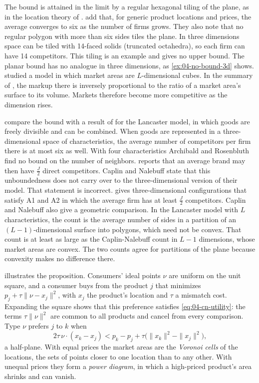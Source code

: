 The bound is attained in the limit by a regular hexagonal tiling of the plane, as in the location theory of
\citet{Losch1954}. \citet{CaplinNalebuff1991} add that, for generic product locations and prices, the average
converges to six as the number of firms grows. They also note that no regular polygon with more than six sides
tiles the plane. In three dimensions space can be tiled with 14-faced solids (truncated octahedra), so each firm
can have 14 competitors. This tiling is an example and gives no upper bound. The planar bound has no analogue in
three dimensions, as \cref{ex:04-no-bound-3d} shows. \citet{Stiglitz1986} studied a model in which market areas are
$L$-dimensional cubes. In the summary of \citet{CaplinNalebuff1991}, the markup there is inversely proportional to
the ratio of a market area's surface to its volume. Markets therefore become more competitive as the dimension
rises.

\citet[n.~17]{CaplinNalebuff1991} compare the bound with a result of \citet{ArchibaldRosenbluth1975} for the
Lancaster model, in which goods are freely divisible and can be combined. When goods are represented in a
three-dimensional space of characteristics, the average number of competitors per firm there is at most six as well.
With four characteristics Archibald and Rosenbluth find no bound on the number of neighbors.
\citet[Section 7.1.2, n.~6]{Tirole1988} reports that an average brand may then have $\frac{J}{2}$ direct
competitors. Caplin and Nalebuff state that this unboundedness does not carry over to the three-dimensional version
of their model. That statement is incorrect.  gives three-dimensional configurations that
satisfy A1 and A2 in which the average firm has at least $\frac{J}{2}$ competitors. Caplin and Nalebuff also give
a geometric comparison. In the Lancaster model with $L$ characteristics, the count is the average number of sides
in a partition of an $(L-1)$-dimensional surface into polygons, which need not be convex. That count is at least
as large as the Caplin-Nalebuff count in $L - 1$ dimensions, whose market areas are convex. The two counts agree
for partitions of the plane because convexity makes no difference there.

 illustrates the proposition. Consumers' ideal points $\nu$ are uniform on the unit square,
and a consumer buys from the product $j$ that minimizes $p_j + \tau\|\nu - x_j\|^2$, with $x_j$ the product's
location and $\tau$ a mismatch cost. Expanding the square shows that this preference satisfies
\eqref{eq:04-cn-utility}: the terms $\tau\|\nu\|^2$ are common to all products and cancel from every comparison.
Type $\nu$ prefers $j$ to $k$ when
\begin{equation*}
2\tau\,\nu \cdot (x_k - x_j) < p_k - p_j + \tau\big(\|x_k\|^2 - \|x_j\|^2\big),
\end{equation*}
a half-plane. With equal prices the market areas are the \emph{Voronoi cells} of the locations, the sets of points
closer to one location than to any other. With unequal prices they form a \emph{power diagram}, in which a
high-priced product's area shrinks and can vanish.

